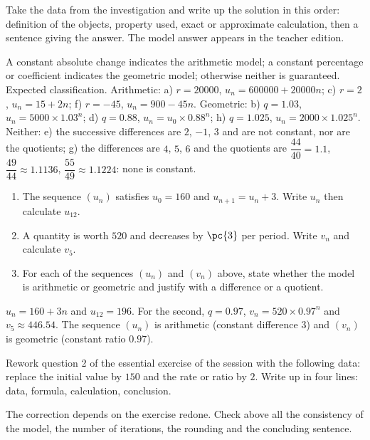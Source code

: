 \begin{example}
Take the data from the investigation and write up the solution in this order: definition of the objects, property used, exact or approximate calculation, then a sentence giving the answer. The model answer appears in the teacher edition.
\end{example}
\begin{solution}A constant absolute change indicates the arithmetic model; a constant percentage or coefficient indicates the geometric model; otherwise neither is guaranteed. Expected classification. Arithmetic: a) $r=\num{20000}$, $u_n=\num{600000}+\num{20000}n$; c) $r=2$, $u_n=15+2n$; f) $r=-45$, $u_n=900-45n$. Geometric: b) $q=\num{1,03}$, $u_n=\num{5000}\times\num{1,03}^n$; d) $q=\num{0,88}$, $u_n=u_0\times\num{0,88}^n$; h) $q=\num{1,025}$, $u_n=\num{2000}\times\num{1,025}^n$. Neither: e) the successive differences are $2$, $-1$, $3$ and are not constant, nor are the quotients; g) the differences are $4$, $5$, $6$ and the quotients are $\dfrac{44}{40}=\num{1,1}$, $\dfrac{49}{44}\approx\num{1,1136}$, $\dfrac{55}{49}\approx\num{1,1224}$: none is constant.\end{solution}

\begin{exercise}[essential]
\begin{enumerate}\item The sequence $(u_n)$ satisfies $u_0=160$ and $u_{n+1}=u_n+3$. Write $u_n$ then calculate $u_{12}$.\item A quantity is worth $520$ and decreases by $\pc{3}$ per period. Write $v_n$ and calculate $v_5$.\item For each of the sequences $(u_n)$ and $(v_n)$ above, state whether the model is arithmetic or geometric and justify with a difference or a quotient.\end{enumerate}
\end{exercise}
\begin{solution}$u_n=160+3n$ and $u_{12}=196$. For the second, $q=\num{0,97}$, $v_n=520\times\num{0,97}^n$ and $v_5\approx\num{446,54}$. The sequence $(u_n)$ is arithmetic (constant difference $3$) and $(v_n)$ is geometric (constant ratio $\num{0,97}$).\end{solution}


\begin{homework}Rework question 2 of the essential exercise of the session with the following data: replace the initial value by $150$ and the rate or ratio by $2$. Write up in four lines: data, formula, calculation, conclusion.\end{homework}
\begin{solution}The correction depends on the exercise redone. Check above all the consistency of the model, the number of iterations, the rounding and the concluding sentence.\end{solution}

